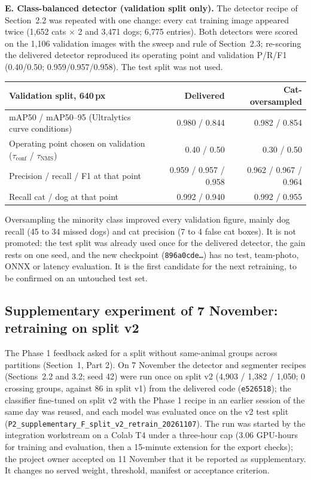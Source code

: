 \documentclass[11pt,a4paper]{article}
\newcommand{\tconf}{$\tau_{\text{conf}}$}
\newcommand{\tnms}{$\tau_{\text{NMS}}$}
\newcommand{\ev}[1]{\nolinkurl{#1}}
\begin{document}
\textbf{E. Class-balanced detector (validation split only).} The detector recipe of Section~2.2 was repeated with one change: every cat training image appeared twice (1,652 cats $\times$ 2 and 3,471 dogs; 6,775 entries). Both detectors were scored on the 1,106 validation images with the sweep and rule of Section~2.3; re-scoring the delivered detector reproduced its operating point and validation P/R/F1 (0.40/0.50; 0.959/0.957/0.958). The test split was not used.

\begin{tabularx}{\linewidth}{@{}Y r r@{}}
\toprule
Validation split, 640\,px & Delivered & Cat-oversampled \\
\midrule
mAP50 / mAP50--95 (Ultralytics curve conditions) & 0.980 / 0.844 & 0.982 / 0.854 \\
Operating point chosen on validation (\tconf{} / \tnms{}) & 0.40 / 0.50 & 0.30 / 0.50 \\
Precision / recall / F1 at that point & 0.959 / 0.957 / 0.958 & 0.962 / 0.967 / 0.964 \\
Recall cat / dog at that point & 0.992 / 0.940 & 0.992 / 0.955 \\
\bottomrule
\end{tabularx}

Oversampling the minority class improved every validation figure, mainly dog recall (45 to 34 missed dogs) and cat precision (7 to 4 false cat boxes). It is not promoted: the test split was already used once for the delivered detector, the gain rests on one seed, and the new checkpoint (\texttt{896a0cde\ldots}) has no test, team-photo, ONNX or latency evaluation. It is the first candidate for the next retraining, to be confirmed on an untouched test set.

\subsection{Supplementary experiment of 7 November: retraining on split v2}\label{sec:suppf}

The Phase 1 feedback asked for a split without same-animal groups across partitions (Section~1, Part 2). On 7 November the detector and segmenter recipes (Sections~2.2 and 3.2; seed 42) were run once on split v2 (4,903 / 1,382 / 1,050; 0 crossing groups, against 86 in split v1) from the delivered code (\texttt{e526518}); the classifier fine-tuned on split v2 with the Phase 1 recipe in an earlier session of the same day was reused, and each model was evaluated once on the v2 test split (\ev{P2_supplementary_F_split_v2_retrain_20261107}). The run was started by the integration workstream on a Colab T4 under a three-hour cap (3.06 GPU-hours for training and evaluation, then a 15-minute extension for the export checks); the project owner accepted on 11 November that it be reported as supplementary. It changes no served weight, threshold, manifest or acceptance criterion.
\end{document}
